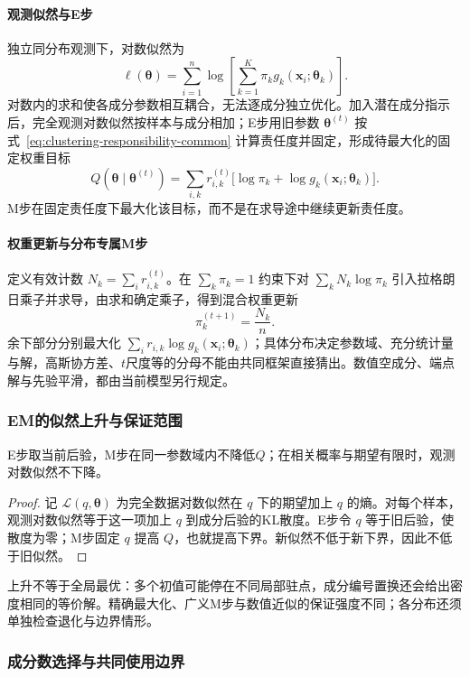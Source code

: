 \paragraph{观测似然与E步}

独立同分布观测下，对数似然为
\[
 \ell(\bm\theta)=\sum_{i=1}^n\log\!\left[\sum_{k=1}^K\pi_k g_k(\bm{x}_i;\bm\theta_k)\right].
\]
对数内的求和使各成分参数相互耦合，无法逐成分独立优化。加入潜在成分指示后，完全观测对数似然按样本与成分相加；E步用旧参数 $\bm\theta^{(t)}$ 按式~\eqref{eq:clustering-responsibility-common} 计算责任度并固定，形成待最大化的固定权重目标
\[
 Q(\bm\theta\mid\bm\theta^{(t)})
 =\sum_{i,k}r_{i,k}^{(t)}
   \bigl[\log\pi_k+\log g_k(\bm{x}_i;\bm\theta_k)\bigr].
\]
M步在固定责任度下最大化该目标，而不是在求导途中继续更新责任度。

\paragraph{权重更新与分布专属M步}

定义有效计数 $N_k=\sum_i r_{i,k}^{(t)}$。在 $\sum_k\pi_k=1$ 约束下对 $\sum_k N_k\log\pi_k$ 引入拉格朗日乘子并求导，由求和确定乘子，得到混合权重更新
\[
 \pi_k^{(t+1)}=\frac{N_k}{n}.
\]
余下部分分别最大化 $\sum_i r_{i,k}\log g_k(\bm{x}_i;\bm\theta_k)$；具体分布决定参数域、充分统计量与解，高斯协方差、$t$尺度等的分母不能由共同框架直接猜出。数值空成分、端点解与先验平滑，都由当前模型另行规定。

\subsubsection{EM的似然上升与保证范围}

\begin{theorem}[精确EM的似然上升]
 \label{thm:clustering-em}
 E步取当前后验，M步在同一参数域内不降低$Q$；在相关概率与期望有限时，观测对数似然不下降。
\end{theorem}
\begin{proof}
记 $\mathcal L(q,\bm\theta)$ 为完全数据对数似然在 $q$ 下的期望加上 $q$ 的熵。对每个样本，观测对数似然等于这一项加上 $q$ 到成分后验的KL散度。E步令 $q$ 等于旧后验，使散度为零；M步固定 $q$ 提高 $Q$，也就提高下界。新似然不低于新下界，因此不低于旧似然。
\end{proof}

上升不等于全局最优：多个初值可能停在不同局部驻点，成分编号置换还会给出密度相同的等价解。精确最大化、广义M步与数值近似的保证强度不同；各分布还须单独检查退化与边界情形。

\subsubsection{成分数选择与共同使用边界}


